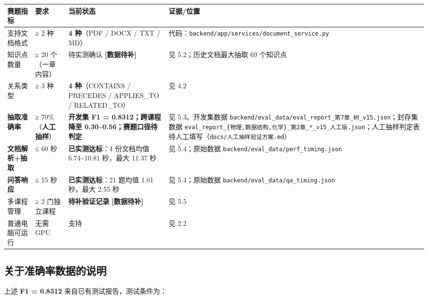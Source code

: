 \documentclass[UTF8,a4paper,11pt]{ctexrep}
\newcommand{\todomark}{\textcolor{todobar}{\textbf{[数据待补]}}}
\begin{document}
\begin{center}
\small
\begin{tabularx}{\linewidth}{@{}XXXX@{}}
\toprule
赛题指标 & 要求 & 当前状态 & 证据/位置 \\
\midrule
支持文档格式 & ≥ 2 种 & \textbf{4 种}（PDF / DOCX / TXT / MD） & 代码：\texttt{backend/app/services/document\_service.py} \\
知识点数量 & ≥ 20 个（一章内容） & 待实测确认 \todomark{} & 见 5.2；历史文档最大抽取 69 个知识点 \\
关系类型 & ≥ 3 种 & \textbf{4 种}（CONTAINS / PRECEDES / APPLIES\_TO / RELATED\_TO） & 见 4.2 \\
\textbf{抽取准确率} & ≥ 70\%（\textbf{人工抽样}） & \textbf{开发集 F1 = 0.8312；跨课程降至 0.30\textasciitilde{}0.56；赛题口径待判定} & 见 5.3。开发集数据 \texttt{backend/eval\_data/eval\_report\_第7章\_树\_v15.json}；封存集数据 \texttt{eval\_report\_\{物理,数据结构,化学\}\_第2章\_*\_v15\_人工版.json}；人工抽样判定表待人工填写（\texttt{docs/人工抽样验证方案.md}） \\
\textbf{文档解析+抽取} & ≤ 60 秒 & \textbf{已实测达标}：4 份文档均值 6.74\textasciitilde{}10.81 秒，最大 11.37 秒 & 见 5.4；原始数据 \texttt{backend/eval\_data/perf\_timing.json} \\
\textbf{问答响应} & ≤ 15 秒 & \textbf{已实测达标}：21 题均值 1.61 秒，最大 2.55 秒 & 见 5.4；原始数据 \texttt{backend/eval\_data/qa\_timing.json} \\
多课程管理 & ≥ 2 门独立课程 & \textbf{待补验证记录} \todomark{} & 见 5.5 \\
普通电脑可运行 & 无需 GPU & 支持 & 见 2.2 \\
\bottomrule
\end{tabularx}
\end{center}

\subsection{关于准确率数据的说明}

上述 \textbf{F1 = 0.8312} 来自已有测试报告，测试条件为：
\end{document}
